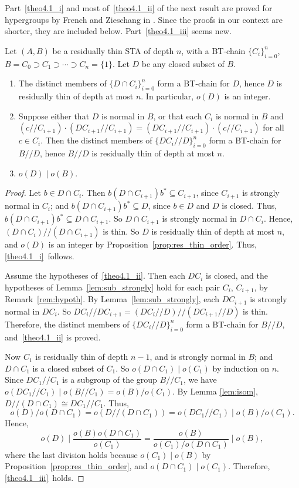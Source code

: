 \documentclass[ALCO,ThmDefs,Unicode,epreuves]{cedram}
\begin{document}
Part~\ref{theo4.1_i}  and most of~\ref{theo4.1_ii} of the next result are proved for hypergroups by
French and Zieschang in
\cite [Theorem~6.3]{FZ}. Since the proofs in our context are 
shorter, they are included below. Part~\ref{theo4.1_iii} seems new.

\begin{thm}
\label{thm:res_thin_sub_quo}
Let $(A, B)$ be a residually thin STA of depth $n$, with a BT-chain
$\{C_i\}_{i=0}^n$, $B = C_0 \supset C_1 \supset \cdots \supset C_n =
\{1\}$. Let $D$ be any closed subset of $B$.
\begin{enumerate}[label = \textup{(}\roman*\textup{)}] 
\item\label{theo4.1_i} The distinct members of $\{D\cap C_i\}_{i=0}^n$ form a BT-chain for $D$,
hence $D$ is residually thin of depth at most $n$. In particular,
$o(D)$ is an integer.
\item\label{theo4.1_ii} Suppose either that $D$ is normal in $B$, or that each $C_i$ is normal in $B$
and $(c//C_{i+1})\cdot(DC_{i+1}//C_{i+1}) =
(DC_{i+1}//C_{i+1})\cdot(c//C_{i+1})$ for all $c \in C_i$. Then the distinct members of
$\{DC_i//D\}_{i=0}^n$ form a BT-chain for $B//D$, hence $B//D$ is
residually thin of depth at most $n$.
\item\label{theo4.1_iii} $o(D) \mid o(B)$.
\end{enumerate}
\end{thm}

\begin{proof}
Let $b \in D\cap C_i$. Then $b(D\cap C_{i+1})b^* \subseteq C_{i+1}$,
since $C_{i+1}$ is strongly normal in $C_i$; and $b(D\cap C_{i+1})b^* \subseteq
D$, since $b \in D$ and $D$ is closed. Thus, $b(D\cap C_{i+1})b^*
\subseteq D\cap C_{i+1}$. So $D\cap C_{i+1}$ is strongly normal in $D\cap
C_i$. Hence, $(D\cap C_i)//(D\cap C_{i+1})$ is thin. So $D$ is
residually thin of depth at most $n$, and $o(D)$ is an integer by
Proposition~\ref{prop:res_thin_order}. Thus, \ref{theo4.1_i}~follows.

Assume the hypotheses of~\ref{theo4.1_ii}. Then each $DC_i$ is closed, and the
hypotheses of Lemma~\ref{lem:sub_strongly} hold for each pair $C_i$,
$C_{i+1}$, by Remark~\ref{rem:hypoth}. By 
Lemma~\ref{lem:sub_strongly}, each $DC_{i+1}$ is strongly normal in
$DC_i$. So $DC_i//DC_{i+1} = (DC_i//D)//(DC_{i+1}//D)$ is thin.
Therefore, the distinct members of $\{DC_i//D\}_{i=0}^n$ form a BT-chain
for $B//D$, and~\ref{theo4.1_ii} is proved.

Now $C_1$ is residually thin of depth $n-1$, and is strongly normal in
$B$; and $D\cap C_1$ is a closed
subset of $C_1$. So $o(D\cap C_1) \mid o(C_1)$ by induction on
$n$. Since $DC_1//C_1$ is a subgroup of the group $B//C_1$, we have
$o(DC_1//C_1) \mid o(B//C_1) = o(B)/o(C_1)$. By Lemma
\ref{lem:isom}, $D//(D\cap C_1) \cong DC_1//C_1$. Thus,
\[
o(D)/o(D\cap C_1) = o(D//(D\cap C_1)) = o(DC_1//C_1) \mid 
o(B)/o(C_1).
\]
Hence, 
\[
o(D) \mid \frac{o(B)o(D\cap C_1)}{o(C_1)} =
\frac{o(B)}{o(C_1)/o(D\cap C_1)} \mid o(B),
\]
where the last division holds because $o(C_1) \mid o(B)$ by
Proposition~\ref{prop:res_thin_order}, and $o(D\cap C_1) \mid 
o(C_1)$. Therefore, \ref{theo4.1_iii}~holds. 
\end{proof}
\end{document}
